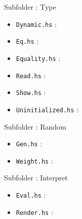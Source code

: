 Subfolder : Type
\begin{itemize}
	\item \texttt{Dynamic.hs} :
	\item \texttt{Eq.hs} : 
	\item \texttt{Equality.hs} : 
	\item \texttt{Read.hs} : 
	\item \texttt{Show.hs} : 
	\item \texttt{Uninitialized.hs} : 
\end{itemize}


Subfolder : Random
\begin{itemize}
	\item \texttt{Gen.hs} :
	\item \texttt{Weight.hs} : 
\end{itemize}


Subfolder : Interpret
\begin{itemize}
	\item \texttt{Eval.hs} :
	\item \texttt{Render.hs} : 
\end{itemize}